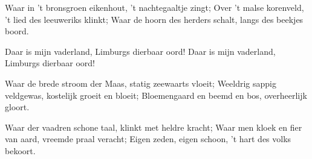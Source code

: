 \begin{verse*}
Waar in ’t bronsgroen eikenhout,
’t nachtegaaltje zingt;
Over ’t malse korenveld,
’t lied des leeuweriks klinkt;
Waar de hoorn des herders schalt,
langs des beekjes boord.
\end{verse*}

\begin{chorus}
Daar is mijn vaderland,
Limburgs dierbaar oord!
Daar is mijn vaderland,
Limburgs dierbaar oord!

\end{chorus}

\begin{verse*}
Waar de brede stroom der Maas,
statig zeewaarts vloeit;
Weeldrig sappig veldgewas,
kostelijk groeit en bloeit;
Bloemengaard en beemd en bos,
overheerlijk gloort.
\end{verse*}

\thechorus

\begin{verse*}
Waar der vaadren schone taal,
klinkt met heldre kracht;
Waar men kloek en fier van aard,
vreemde praal veracht;
Eigen zeden, eigen schoon,
’t hart des volks bekoort.
\end{verse*}

\thechorus
